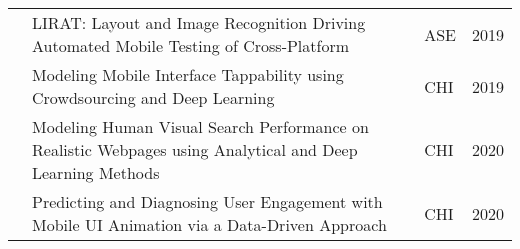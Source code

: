 \begin{sidewaystable}
\begin{tabular}{@{} lp{12.9cm}ll @{}}
\citet{Yu-2019-ASE}          & LIRAT: Layout and Image Recognition Driving Automated Mobile Testing of Cross-Platform                                              & ASE            & 2019          \\

\citet{Swearngin-2019-CHI}   & Modeling Mobile Interface Tappability using Crowdsourcing and Deep Learning                                                         & CHI            & 2019          \\

\citet{Yuan-2020-CHI}        & Modeling Human Visual Search Performance on Realistic Webpages using Analytical and Deep Learning Methods                           & CHI            & 2020          \\

\citet{Wu-2020-CHI}          & Predicting and Diagnosing User Engagement with Mobile UI Animation via a Data-Driven Approach                                       & CHI            & 2020          \\ 

\bottomrule 

\end{tabular}
\end{sidewaystable}